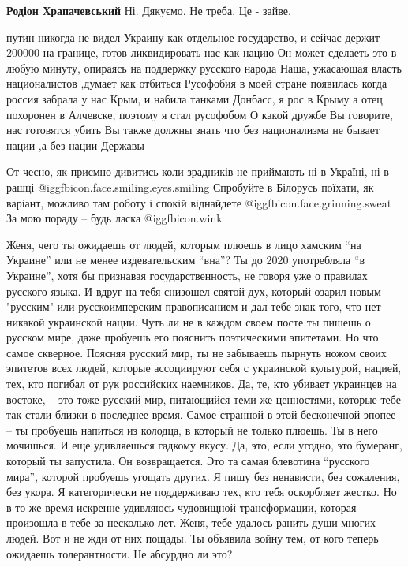 \begin{itemize}
\begin{itemize} %
\textbf{Родіон Храпачевський} Ні. Дякуємо. Не треба. Це - зайве.
\end{itemize} %


путин никогда не видел Украину как отдельное государство, и сейчас держит
200000 на границе, готов ликвидировать нас как нацию Он может сделаеть это в
любую минуту, опираясь на поддержку русского народа Наша, ужасающая власть
националистов ,думает как отбиться Русофобия в моей стране появилась когда
россия забрала у нас Крым, и набила танками Донбасс, я рос в Крыму а отец
похоронен в Алчевске, поэтому я стал русофобом О какой дружбе Вы говорите, нас
готовятся убить Вы также должны знать что без национализма не бывает нации ,а
без нации Державы


От чесно, як приємно дивитись коли зрадників не приймають ні в Україні, ні в
рашці  @igg{fbicon.face.smiling.eyes.smiling}  Спробуйте в Білорусь поїхати, як варіант, можливо там роботу і спокій
віднайдете  @igg{fbicon.face.grinning.sweat}  За мою пораду – будь ласка  @igg{fbicon.wink} 


Женя, чего ты ожидаешь от людей, которым плюешь в лицо хамским \enquote{на Украине} или
не менее издевательским \enquote{вна}? Ты до 2020 употребляла \enquote{в Украине}, хотя бы
признавая государственность, не говоря уже о правилах русского языка. И вдруг
на тебя снизошел святой дух, который озарил новым "русским" или русскоимперским
правописанием и дал тебе знак того, что нет никакой украинской нации. Чуть ли
не в каждом своем посте ты пишешь о русском мире, даже пробуешь его пояснить
поэтическими эпитетами. Но что самое скверное. Поясняя русский мир, ты не
забываешь пырнуть ножом своих эпитетов всех людей, которые ассоциируют себя с
украинской культурой, нацией, тех, кто погибал от рук российских наемников. Да,
те, кто убивает украинцев на востоке, – это тоже русский мир, питающийся теми
же ценностями, которые тебе так стали близки в последнее время. Самое странной
в этой бесконечной эпопее – ты пробуешь напиться из колодца, в который не
только плюешь. Ты в него мочишься. И еще удивляешься гадкому вкусу. Да, это,
если угодно, это бумеранг, который ты запустила. Он возвращается. Это та самая
блевотина \enquote{русского мира}, которой пробуешь угощать других. Я пишу без
ненависти, без сожаления, без укора. Я категорически не поддерживаю тех, кто
тебя оскорбляет жестко. Но в то же время искренне удивляюсь чудовищной
трансформации, которая произошла в тебе за несколько лет. Женя, тебе удалось
ранить души многих людей. Вот и не жди от них пощады. Ты объявила войну тем, от
кого теперь ожидаешь толерантности. Не абсурдно ли это?


\end{itemize}
